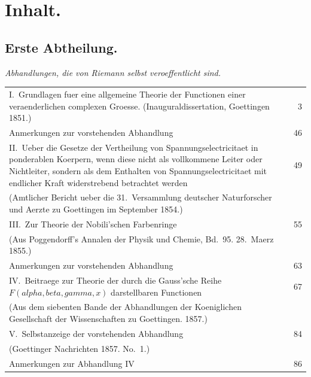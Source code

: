 \documentclass[11pt,a4paper]{article}
\theoremstyle{plain}
\theoremstyle{definition}
\begin{document}
\clearpage

\section*{Inhalt.}

\subsection*{Erste Abtheilung.}

\textit{Abhandlungen, die von Riemann selbst veroeffentlicht sind.}

\begin{longtable}{p{12cm}r}
I.\ Grundlagen fuer eine allgemeine Theorie der Functionen einer veraenderlichen complexen Groesse. (Inauguraldissertation, Goettingen 1851.) & 3\\
\quad Anmerkungen zur vorstehenden Abhandlung & 46\\[0.5em]

II.\ Ueber die Gesetze der Vertheilung von Spannungselectricitaet in ponderablen Koerpern, wenn diese nicht als vollkommene Leiter oder Nichtleiter, sondern als dem Enthalten von Spannungselectricitaet mit endlicher Kraft widerstrebend betrachtet werden & 49\\
\quad (Amtlicher Bericht ueber die 31.\ Versammlung deutscher Naturforscher und Aerzte zu Goettingen im September 1854.)\\[0.5em]

III.\ Zur Theorie der Nobili'schen Farbenringe & 55\\
\quad (Aus Poggendorff's Annalen der Physik und Chemie, Bd.\ 95. 28.\ Maerz 1855.)\\
\quad Anmerkungen zur vorstehenden Abhandlung & 63\\[0.5em]

IV.\ Beitraege zur Theorie der durch die Gauss'sche Reihe $F(alpha, beta, gamma, x)$ darstellbaren Functionen & 67\\
\quad (Aus dem siebenten Bande der Abhandlungen der Koeniglichen Gesellschaft der Wissenschaften zu Goettingen. 1857.)\\[0.5em]

V.\ Selbstanzeige der vorstehenden Abhandlung & 84\\
\quad (Goettinger Nachrichten 1857. No.\ 1.)\\
\quad Anmerkungen zur Abhandlung IV & 86\\[0.5em]


\end{longtable}
\end{document}
